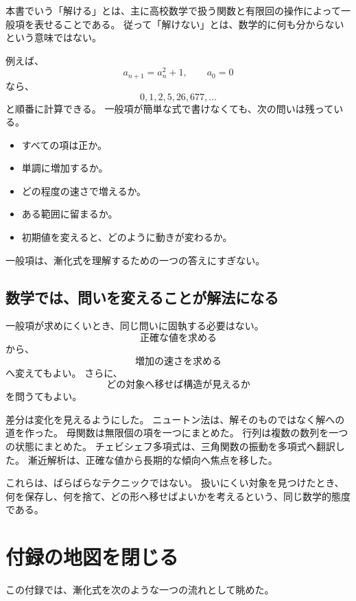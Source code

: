 本書でいう「解ける」とは、主に高校数学で扱う関数と有限回の操作によって一般項を表せることである。
従って「解けない」とは、数学的に何も分からないという意味ではない。

例えば、
\[
  a_{n+1}=a_n^2+1,\qquad a_0=0
\]
なら、
\[
  0,1,2,5,26,677,\ldots
\]
と順番に計算できる。
一般項が簡単な式で書けなくても、次の問いは残っている。

\begin{itemize}
  \item すべての項は正か。
  \item 単調に増加するか。
  \item どの程度の速さで増えるか。
  \item ある範囲に留まるか。
  \item 初期値を変えると、どのように動きが変わるか。
\end{itemize}

一般項は、漸化式を理解するための一つの答えにすぎない。

\subsection{数学では、問いを変えることが解法になる}

一般項が求めにくいとき、同じ問いに固執する必要はない。
\[
  \text{正確な値を求める}
\]
から、
\[
  \text{増加の速さを求める}
\]
へ変えてもよい。
さらに、
\[
  \text{どの対象へ移せば構造が見えるか}
\]
を問うてもよい。

差分は変化を見えるようにした。
ニュートン法は、解そのものではなく解への道を作った。
母関数は無限個の項を一つにまとめた。
行列は複数の数列を一つの状態にまとめた。
チェビシェフ多項式は、三角関数の振動を多項式へ翻訳した。
漸近解析は、正確な値から長期的な傾向へ焦点を移した。

これらは、ばらばらなテクニックではない。
扱いにくい対象を見つけたとき、何を保存し、何を捨て、どの形へ移せばよいかを考えるという、同じ数学的態度である。

\section{付録の地図を閉じる}

この付録では、漸化式を次のような一つの流れとして眺めた。

